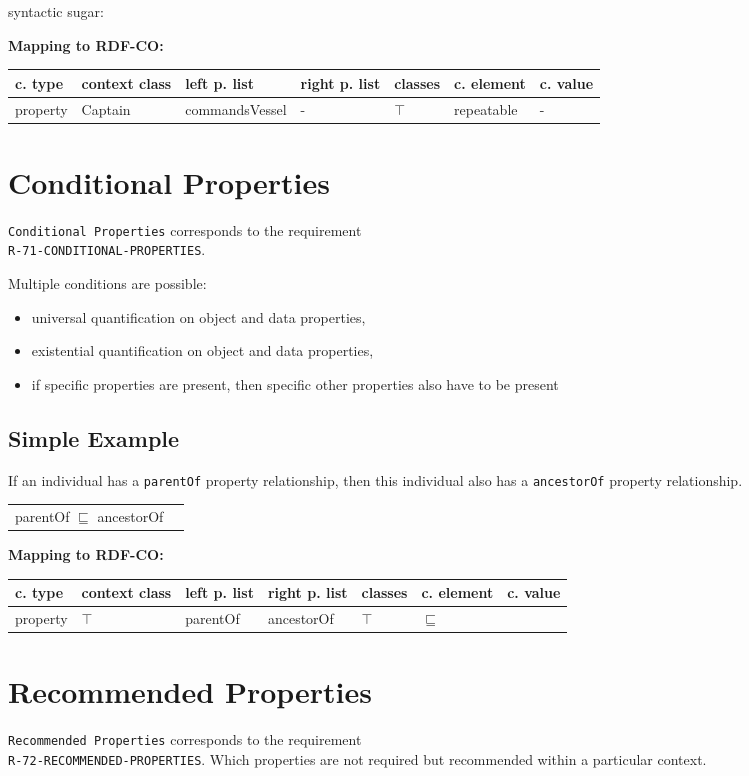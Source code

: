 \documentclass{llncs}
\newcommand{\ms}[1]{\texttt{#1}}
\newenvironment{gcotable}{
  \scriptsize
  \sffamily
  \vspace{0cm}
	\begin{center}
	\textbf{\vspace{0.4cm}Mapping to RDF-CO:} \\
  \begin{tabular}{l|l|l|l|l|l|l}
	\hline
  \textbf{c. type} & \textbf{context class} & \textbf{left p. list} & \textbf{right p. list} & \textbf{classes} & \textbf{c. element} & \textbf{c. value} \\
  \hline

}{
  \hline
  \end{tabular}
	\end{center}
}
\newenvironment{DL}{
  \vspace{0cm}
	\begin{center}
  \begin{tabular}{r l}

}{
  \end{tabular}
	\end{center}
}
\begin{document}
syntactic sugar:

\begin{gcotable}
property & Captain & commandsVessel & - & $\top$ & repeatable & - \\
\end{gcotable}

\section{Conditional Properties}

\ms{Conditional Properties} corresponds to the requirement \\
\ms{R-71-CONDITIONAL-PROPERTIES}.

Multiple conditions are possible:

\begin{itemize}
  \item universal quantification on object and data properties,
  \item existential quantification on object and data properties,
  \item if specific properties are present, then specific other properties also have to be present
\end{itemize}

\subsection{Simple Example}

If an individual has a \ms{parentOf} property relationship, then this individual also has a \ms{ancestorOf} property relationship.

\begin{DL}
parentOf $\sqsubseteq$ ancestorOf 
\end{DL}

\begin{gcotable}
property & $\top$ & parentOf & ancestorOf & $\top$ & $\sqsubseteq$ \\
\end{gcotable}

\section{Recommended Properties}

\ms{Recommended Properties} corresponds to the requirement \\
\ms{R-72-RECOMMENDED-PROPERTIES}.
Which properties are not required but recommended within a particular context.
\end{document}
